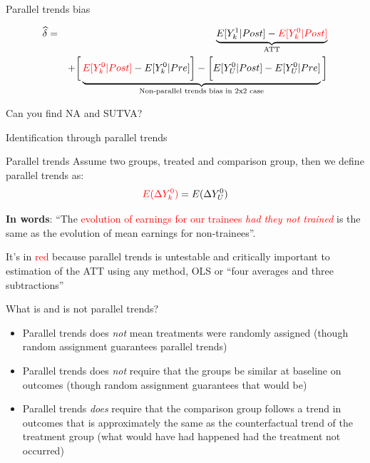 \documentclass{beamer}
\begin{document}
\begin{frame}{Parallel trends bias}

\begin{eqnarray*}
\widehat{\delta} &=& \underbrace{E[Y^1_k | Post] - \textcolor{red}{E[Y^0_k | Post]}}_{\mathclap{\text{ATT}}} \\
&& + \bigg [  \underbrace{\textcolor{red}{E[Y^0_k | Post]} - E[Y^0_k | Pre] \bigg ] - \bigg [ E[Y^0_U | Post] - E[Y_U^0 | Pre] }_{\mathclap{\text{Non-parallel trends bias in 2x2 case}}} \bigg ]
\end{eqnarray*}

Can you find NA and SUTVA?


\end{frame}

\begin{frame}{Identification through parallel trends}
	

	\begin{block}{Parallel trends}
	Assume two groups, treated and comparison group, then we define parallel trends as:	 $$\textcolor{red}{E(}\textcolor{red}{\Delta Y^0_k)} = E(\Delta Y^0_U)$$
	\end{block}

\textbf{In words}: ``The \textcolor{red}{evolution of earnings for our trainees \emph{had they not trained}} is the same as the evolution of mean earnings for non-trainees''.  

\bigskip

It's in \textcolor{red}{red} because parallel trends is untestable and critically important to estimation of the ATT using any method, OLS or ``four averages and three subtractions''

	

	
\end{frame}


\begin{frame}{What is and is not parallel trends?}

\begin{itemize}
\item Parallel trends does \emph{not} mean treatments were randomly assigned (though random assignment guarantees parallel trends)
\item Parallel trends does \emph{not} require that the groups be similar at baseline on outcomes (though random assignment guarantees that would be)
\item Parallel trends \emph{does} require that the comparison group follows a trend in outcomes that is approximately the same as the counterfactual trend of the treatment group (what would have had happened had the treatment not occurred)
\end{itemize}

\end{frame}
\end{document}
